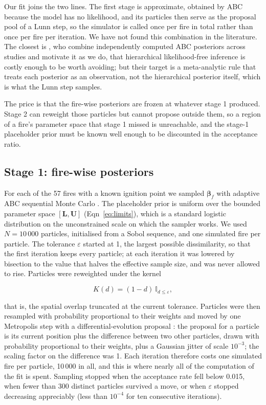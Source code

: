 \documentclass[11pt,a4paper]{article}
\begin{document}
Our fit joins the two lines. The first stage is approximate, obtained by ABC because the model
has no likelihood, and its particles then serve as the proposal pool of a Lunn step, so the
simulator is called once per fire in total rather than once per fire per iteration. We have not
found this combination in the literature. The closest is \citet{blomstedt2026meta}, who
combine independently computed ABC posteriors across studies and motivate it as we do, that
hierarchical likelihood-free inference is costly enough to be worth avoiding; but their target
is a meta-analytic rule that treats each posterior as an observation, not the hierarchical
posterior itself, which is what the Lunn step samples.

The price is that the fire-wise posteriors are frozen at whatever stage 1 produced. Stage 2
can reweight those particles but cannot propose outside them, so a region of a fire's
parameter space that stage 1 missed is unreachable, and the stage-1 placeholder prior must be
known well enough to be discounted in the acceptance ratio.

\subsection{Stage 1: fire-wise posteriors}

For each of the 57 fires with a known ignition point we sampled $\boldsymbol{\beta}_f$
with adaptive ABC sequential Monte Carlo \citep{delmoral2012adaptive}. The placeholder
prior is uniform over the bounded parameter space $[\mathbf{L}, \mathbf{U}]$
(Eqn~\ref{eq:limits}), which is a standard logistic distribution on the unconstrained scale on which
the sampler works. We used $N = 10\,000$ particles, initialised from a Sobol sequence, and
one simulated fire per particle. The tolerance $\varepsilon$ started at 1, the largest
possible dissimilarity, so that the first iteration keeps every particle; at each iteration
it was lowered by bisection to the value that halves the effective sample size, and was
never allowed to rise. Particles were reweighted under the kernel

\begin{equation}
\label{eq:abckernel}
K(d) = (1 - d) \ \mathbb{I}_{d \le \varepsilon},
\end{equation}

\noindent that is, the spatial overlap truncated at the current tolerance. Particles were
then resampled with probability proportional to their weights and moved by one Metropolis
step with a differential-evolution proposal \citep{terbraak2006markov}: the proposal for a
particle is its current position plus the difference between two other particles, drawn
with probability proportional to their weights, plus a Gaussian jitter of scale
$10^{-3}$; the scaling factor on the difference was 1. Each iteration therefore costs one
simulated fire per particle, 10\,000 in all, and this is where nearly all of the
computation of the fit is spent. Sampling stopped when the
acceptance rate fell below 0.015, when fewer than 300 distinct particles survived a move,
or when $\varepsilon$ stopped decreasing appreciably (less than $10^{-4}$ for ten
consecutive iterations).
\end{document}
